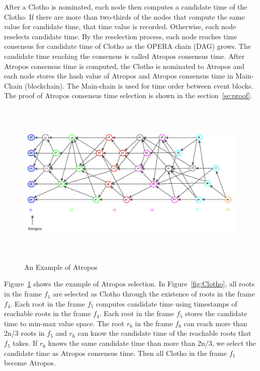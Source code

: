 \documentclass{article}
\begin{document}
After a Clotho is nominated, each node then computes a candidate time of the Clotho. If there are more than two-thirds of the nodes that compute the same value for candidate time, that time value is recorded. Otherwise, each node reselects candidate time. By the reselection process, each node reaches time consensus for candidate time of Clotho as the OPERA chain (DAG) grows. The candidate time reaching the consensus is called Atropos consensus time. After Atropos consensus time is computed, the Clotho is nominated to Atropos and each node stores the hash value of Atropos and Atropos consensus time in Main-Chain (blockchain). The Main-chain is used for time order between event blocks. The proof of Atropos consensus time selection is shown in the section~\ref{se:proof}. 

\begin{figure}[h] \centering  
	\includegraphics[height=8cm, width=1.0\columnwidth]{Atropos_fig1.pdf}
	\caption{An Example of Atropos}
	\label{fig:Atropos}
\end{figure}

Figure~\ref{fig:Atropos} shows the example of Atropos selection. In  Figure~\ref{fig:Clotho}, all roots in the frame $f_1$ are selected as Clotho through the existence of roots in the frame $f_4$. Each root in the frame $f_5$ computes candidate time using timestamps of reachable roots in the frame $f_4$. Each root in the frame $f_5$ stores the candidate time to min-max value space. The root $r_6$ in the frame $f_6$ can reach more than 2n/3 roots in $f_5$ and $r_6$ can know the candidate time of the reachable roots that $f_5$ takes. If $r_6$ knows  the same candidate time than more than 2n/3, we select the candidate time as Atropos consensus time. Then all Clotho in the frame $f_1$ become Atropos. 
\end{document}
